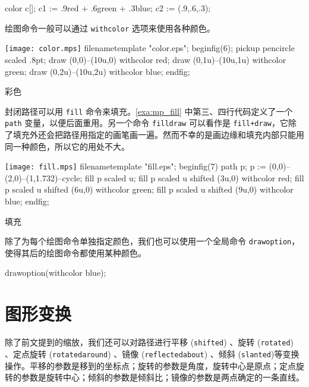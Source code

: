\begin{Code}[]
color c[];
c1 := .9red + .6green + .3blue;
c2 := (.9,.6,.3);
\end{Code}

绘图命令一般可以通过 \texttt{withcolor} 选项来使用各种颜色。

\begin{example}[htbp]
\begin{FBTDemo}[numbers=left]{\texttt{[image: color.mps]}}
filenametemplate "color.eps";
beginfig(6);
pickup pencircle scaled .8pt;
draw (0,0)--(10u,0) withcolor red;
draw (0,1u)--(10u,1u) withcolor green;
draw (0,2u)--(10u,2u) withcolor blue;
endfig;
\end{FBTDemo}
\caption{\MP 彩色}
\label{exa:mp_color}
\end{example}

封闭路径可以用 \texttt{fill} 命令来填充。\autoref{exa:mp_fill} 中第三、四行代码定义了一个 \texttt{path} 变量，以便后面重用。另一个命令 \texttt{filldraw} 可以看作是 \texttt{fill+draw}，它除了填充外还会把路径用指定的画笔画一遍。然而不幸的是画边缘和填充内部只能用同一种颜色，所以它的用处不大。

\begin{example}[htbp]
\begin{FBTDemo}[numbers=left]{\texttt{[image: fill.mps]}}
filenametemplate "fill.eps";
beginfig(7)
path p;
p := (0,0)--(2,0)--(1,1.732)--cycle;
fill p scaled u;
fill p scaled u shifted (3u,0) withcolor red;
fill p scaled u shifted (6u,0) withcolor green;
fill p scaled u shifted (9u,0) withcolor blue;
endfig;
\end{FBTDemo}
\caption{\MP 填充}
\label{exa:mp_fill}
\end{example}

除了为每个绘图命令单独指定颜色，我们也可以使用一个全局命令 \texttt{drawoption}，使得其后的绘图命令都使用某种颜色。

\begin{Code}[]
drawoption(withcolor blue);
\end{Code}

\section{图形变换}

除了前文提到的缩放，我们还可以对路径进行平移 (\texttt{shifted}) 、旋转 (\texttt{rotated}) 、定点旋转 (\texttt{rotatedaround}) 、镜像 (\texttt{reflectedabout})  、倾斜 (\texttt{slanted})等变换操作。平移的参数是移到的坐标点；旋转的参数是角度，旋转中心是原点；定点旋转的参数是旋转中心；倾斜的参数是倾斜比；镜像的参数是两点确定的一条直线。

